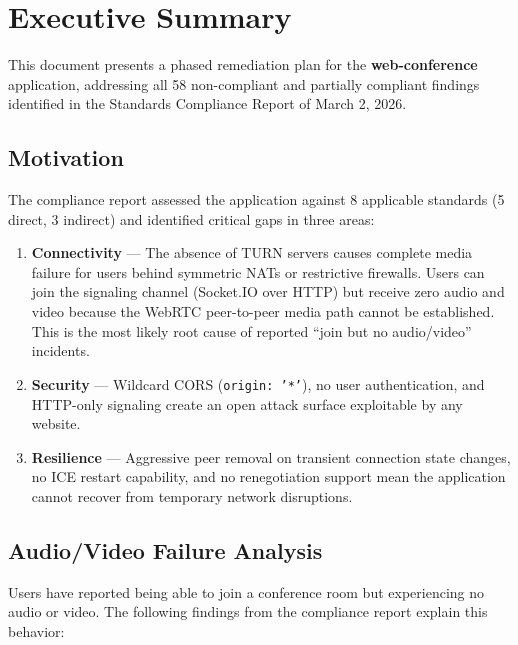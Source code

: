 \documentclass[11pt,letterpaper]{article}
\begin{document}
\tableofcontents
\newpage

\section{Executive Summary}

This document presents a phased remediation plan for the \textbf{web-conference} application, addressing all 58 non-compliant and partially compliant findings identified in the Standards Compliance Report of March 2, 2026.

\subsection{Motivation}

The compliance report assessed the application against 8 applicable standards (5 direct, 3 indirect) and identified critical gaps in three areas:

\begin{enumerate}[leftmargin=2em]
    \item \textbf{Connectivity} --- The absence of TURN servers causes complete media failure for users behind symmetric NATs or restrictive firewalls. Users can join the signaling channel (Socket.IO over HTTP) but receive zero audio and video because the WebRTC peer-to-peer media path cannot be established. This is the most likely root cause of reported ``join but no audio/video'' incidents.
    \item \textbf{Security} --- Wildcard CORS (\texttt{origin: '*'}), no user authentication, and HTTP-only signaling create an open attack surface exploitable by any website.
    \item \textbf{Resilience} --- Aggressive peer removal on transient connection state changes, no ICE restart capability, and no renegotiation support mean the application cannot recover from temporary network disruptions.
\end{enumerate}

\subsection{Audio/Video Failure Analysis}
\label{sec:av-failure}

Users have reported being able to join a conference room but experiencing no audio or video. The following findings from the compliance report explain this behavior:
\end{document}
